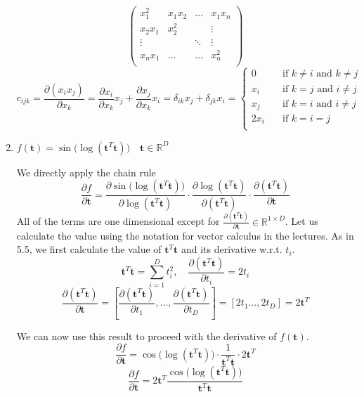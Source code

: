 \begin{enumerate}[label=\alph*]
\[\begin{pmatrix}
    x^2_1 & x_1 x_2 & \dots & x_1 x_n \\
    x_2 x_1 & x^2_2 &    & \vdots \\
    \vdots & & \ddots &  \vdots \\
    x_n x_1 & \dots & \dots & x^2_n \\
\end{pmatrix}
\]
\[
c_{ijk} = \frac{\partial (x_i x_j)}{\partial x_k} = \frac{\partial x_i}{\partial x_k} x_j + \frac{\partial x_j}{\partial x_k} x_i = \delta_{ik}x_j + \delta_{jk}x_i=  \begin{cases}
0 \quad &\text{if }k\neq i \text{ and } k\neq j\\
x_i \quad &\text{if }k=j \text{ and } i\neq j\\
x_j \quad &\text{if }k=i \text{ and } i\neq j\\
2x_i \quad &\text{if }k=i=j\\
\end{cases}
\]

    \item  $f(\textbf{t}) = \sin\big(\log(\textbf{t}^T\textbf{t})\big) \quad \textbf{t} \in \mathbb{R}^D$
    
We directly apply the chain rule
\[
\frac{\partial f}{\partial \textbf{t}} = \frac{\partial \sin\big(\log(\textbf{t}^T\textbf{t})\big)}{\partial \log(\textbf{t}^T\textbf{t})} \cdot \frac{\partial \log(\textbf{t}^T\textbf{t})}{\partial (\textbf{t}^T\textbf{t})} \cdot \frac{\partial (\textbf{t}^T\textbf{t})}{\partial \textbf{t}} 
\]
All of the terms are one dimensional except for $\frac{\partial (\textbf{t}^T\textbf{t})}{\partial \textbf{t}} \in\mathbb{R}^{1\times D}$. Let us calculate the value using the notation for vector calculus in the lectures. As in 5.5, we first calculate the value of $\textbf{t}^T\textbf{t}$ and its derivative w.r.t. $t_i$.
\[
\textbf{t}^T\textbf{t} = \sum_{i=1}^D t_i^2, \quad \frac{\partial (\textbf{t}^T\textbf{t})}{\partial t_i} = 2t_i
\]
\[
\frac{\partial (\textbf{t}^T\textbf{t})}{\partial \textbf{t}} = \left[\frac{\partial (\textbf{t}^T\textbf{t})}{\partial t_1}, \dots, \frac{\partial (\textbf{t}^T\textbf{t})}{\partial t_D}\right] = \left[2t_1 \dots, 2t_D\right] = 2\textbf{t}^T
\]

We can now use this result to proceed with the derivative of $f(\textbf{t})$.
\[
\frac{\partial f}{\partial \textbf{t}} = \cos \big(\log(\textbf{t}^T\textbf{t})\big) \cdot \frac{1}{\textbf{t}^T\textbf{t}} \cdot 2\textbf{t}^T
\]
\[
\frac{\partial f}{\partial \textbf{t}} = 2\textbf{t}^T \frac{\cos\big(\log(\textbf{t}^T\textbf{t})\big)}{\textbf{t}^T\textbf{t}}
\]


\end{enumerate}
